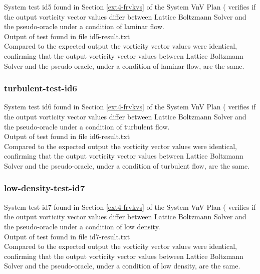 \documentclass[12pt, titlepage]{article}
\newcommand{\myprogname}{Lattice Boltzmann Solver}
\begin{document}
System test id5 found in Section \ref{ext4-frvkvs} of the System VnV Plan (\citet{LBM_SVNV_PM} verifies if the output vorticity vector values differ between {\myprogname} and the pseudo-oracle under a condition of laminar flow.\\

\noindent Output of test found in file id5-result.txt\\

\noindent Compared to the expected output the vorticity vector values were identical, confirming that the output vorticity vector values between {\myprogname} and the pseudo-oracle, under a condition of laminar flow, are the same.\\

\subsubsection{turbulent-test-id6}

System test id6 found in Section \ref{ext4-frvkvs} of the System VnV Plan (\citet{LBM_SVNV_PM} verifies if the output vorticity vector values differ between {\myprogname} and the pseudo-oracle under a condition of turbulent flow.\\

\noindent Output of test found in file id6-result.txt\\

\noindent Compared to the expected output the vorticity vector values were identical, confirming that the output vorticity vector values between {\myprogname} and the pseudo-oracle, under a condition of turbulent flow, are the same.\\

\subsubsection{low-density-test-id7}

System test id7 found in Section \ref{ext4-frvkvs} of the System VnV Plan (\citet{LBM_SVNV_PM} verifies if the output vorticity vector values differ between {\myprogname} and the pseudo-oracle under a condition of low density.\\

\noindent Output of test found in file id7-result.txt\\

\noindent Compared to the expected output the vorticity vector values were identical, confirming that the output vorticity vector values between {\myprogname} and the pseudo-oracle, under a condition of low density, are the same.\\
\end{document}
